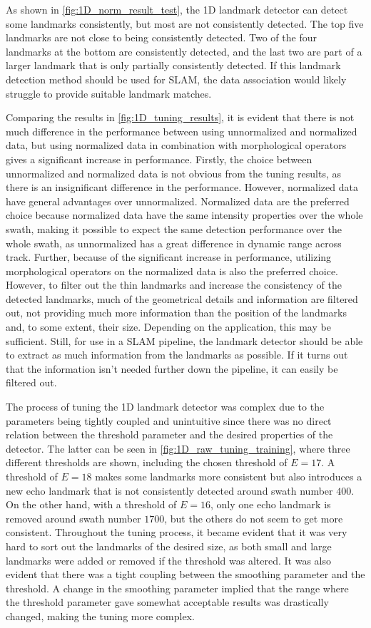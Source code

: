 As shown in \cref{fig:1D_norm_result_test}, the 1D landmark detector can detect some landmarks consistently, but most are not consistently detected. The top five landmarks are not close to being consistently detected. Two of the four landmarks at the bottom are consistently detected, and the last two are part of a larger landmark that is only partially consistently detected. If this landmark detection method should be used for SLAM, the data association would likely struggle to provide suitable landmark matches. 

Comparing the results in \cref{fig:1D_tuning_results}, it is evident that there is not much difference in the performance between using unnormalized and normalized data, but using normalized data in combination with morphological operators gives a significant increase in performance. Firstly, the choice between unnormalized and normalized data is not obvious from the tuning results, as there is an insignificant difference in the performance. However, normalized data have general advantages over unnormalized. Normalized data are the preferred choice because normalized data have the same intensity properties over the whole swath, making it possible to expect the same detection performance over the whole swath, as unnormalized has a great difference in dynamic range across track. Further, because of the significant increase in performance, utilizing morphological operators on the normalized data is also the preferred choice. However, to filter out the thin landmarks and increase the consistency of the detected landmarks, much of the geometrical details and information are filtered out, not providing much more information than the position of the landmarks and, to some extent, their size. Depending on the application, this may be sufficient. Still, for use in a SLAM pipeline, the landmark detector should be able to extract as much information from the landmarks as possible. If it turns out that the information isn't needed further down the pipeline, it can easily be filtered out. 

The process of tuning the 1D landmark detector was complex due to the parameters being tightly coupled and unintuitive since there was no direct relation between the threshold parameter and the desired properties of the detector. The latter can be seen in \cref{fig:1D_raw_tuning_training}, where three different thresholds are shown, including the chosen threshold of $E = 17$. A threshold of $E = 18$ makes some landmarks more consistent but also introduces a new echo landmark that is not consistently detected around swath number $400$. On the other hand, with a threshold of $E = 16$, only one echo landmark is removed around swath number $1700$, but the others do not seem to get more consistent. Throughout the tuning process, it became evident that it was very hard to sort out the landmarks of the desired size, as both small and large landmarks were added or removed if the threshold was altered. It was also evident that there was a tight coupling between the smoothing parameter and the threshold. A change in the smoothing parameter implied that the range where the threshold parameter gave somewhat acceptable results was drastically changed, making the tuning more complex. 

